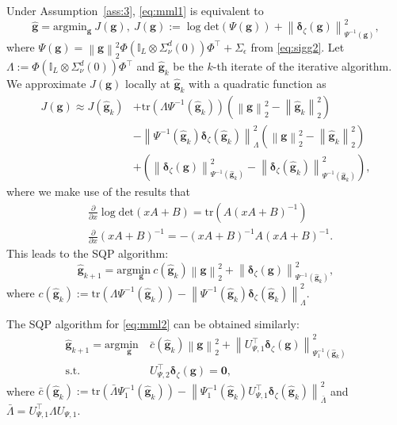 \documentclass{ifacconf}
\newcommand{\norm}[1]{\left\lVert#1\right\rVert}
\newcommand{\tr}[1]{\mathrm{tr}\left(#1\right)}
\newcommand{\dett}[1]{\mathrm{det}\left(#1\right)}
\begin{document}
Under Assumption~\ref{ass:3}, \eqref{eq:mml1} is equivalent to
\begin{equation*}
    \hat{\mathbf{g}}=\mathrm{arg}{\mathrm{min}}_\mathbf{g}\ J(\mathbf{g}),\ J(\mathbf{g}):=\log\dett{\Psi(\mathbf{g})}+\norm{\boldsymbol{\delta}_\zeta(\mathbf{g})}_{\Psi^{-1}(\mathbf{g})}^2,
\end{equation*}
where $\Psi(\mathbf{g})=\norm{\mathbf{g}}_2^2\Phi\left(\mathbb{I}_L\otimes\Sigma_\nu^d(0)\right)\Phi^\top+\Sigma_\epsilon$ from \eqref{eq:sigg2}. Let $\Lambda:=\Phi\left(\mathbb{I}_L\otimes\Sigma_\nu^d(0)\right)\Phi^\top$ and $\hat{\mathbf{g}}_k$ be the $k$-th iterate of the iterative algorithm. We approximate $J(\mathbf{g})$ locally at $\hat{\mathbf{g}}_k$ with a quadratic function as
\begin{align*}
    J(\mathbf{g})\approx J(\hat{\mathbf{g}}_k)&+\tr{\Lambda\Psi^{-1}(\hat{\mathbf{g}}_k)}\left(\norm{\mathbf{g}}_2^2-\norm{\hat{\mathbf{g}}_k}_2^2\right)\\
    &-\norm{\Psi^{-1}(\hat{\mathbf{g}}_k)\boldsymbol{\delta}_\zeta(\hat{\mathbf{g}}_k)}_\Lambda^2\left(\norm{\mathbf{g}}_2^2-\norm{\hat{\mathbf{g}}_k}_2^2\right)\\
    &+\left(\norm{\boldsymbol{\delta}_\zeta(\mathbf{g})}_{\Psi^{-1}(\hat{\mathbf{g}}_k)}^2-\norm{\boldsymbol{\delta}_\zeta(\hat{\mathbf{g}}_k)}_{\Psi^{-1}(\hat{\mathbf{g}}_k)}^2\right),
\end{align*}
where we make use of the results that
\begin{align*}
    &\tfrac{\partial}{\partial x}\log\dett{xA+B}=\tr{A(xA+B)^{-1}}\\
    &\tfrac{\partial}{\partial x}(xA+B)^{-1}=-(xA+B)^{-1}A(xA+B)^{-1}.
\end{align*}
This leads to the SQP algorithm:
\begin{equation}
    \hat{\mathbf{g}}_{k+1}=\mathrm{arg}\underset{\mathbf{g}}{\mathrm{min}}\ c(\hat{\mathbf{g}}_k)\norm{\mathbf{g}}_2^2+\norm{\boldsymbol{\delta}_\zeta(\mathbf{g})}_{\Psi^{-1}(\hat{\mathbf{g}}_k)}^2,
    \label{eq:mapsp}
\end{equation}
where $c(\hat{\mathbf{g}}_k):=\tr{\Lambda\Psi^{-1}(\hat{\mathbf{g}}_k)}-\norm{\Psi^{-1}(\hat{\mathbf{g}}_k)\boldsymbol{\delta}_\zeta(\hat{\mathbf{g}}_k)}_\Lambda^2$.

The SQP algorithm for \eqref{eq:mml2} can be obtained similarly:
\begin{equation}
    \begin{aligned}
        \hat{\mathbf{g}}_{k+1}=\mathrm{arg}\underset{\mathbf{g}}{\mathrm{min}}&\ \bar{c}(\hat{\mathbf{g}}_k)\norm{\mathbf{g}}_2^2+\norm{U_{\Psi,1}^\top\boldsymbol{\delta}_\zeta(\mathbf{g})}_{\Psi_1^{-1}(\hat{\mathbf{g}}_k)}^2\\
        \mathrm{s.t.}&\ U_{\Psi,2}^\top\boldsymbol{\delta}_\zeta(\mathbf{g})=\mathbf{0},
    \end{aligned}
    \label{eq:mapsp2}
\end{equation}
where $\bar{c}(\hat{\mathbf{g}}_k):=\tr{\bar{\Lambda}\Psi_1^{-1}(\hat{\mathbf{g}}_k)}-\norm{\Psi_1^{-1}(\hat{\mathbf{g}}_k)U_{\Psi,1}^\top\boldsymbol{\delta}_\zeta(\hat{\mathbf{g}}_k)}_{\bar{\Lambda}}^2$ and $\bar{\Lambda}=U_{\Psi,1}^\top\Lambda U_{\Psi,1}$.
\end{document}
